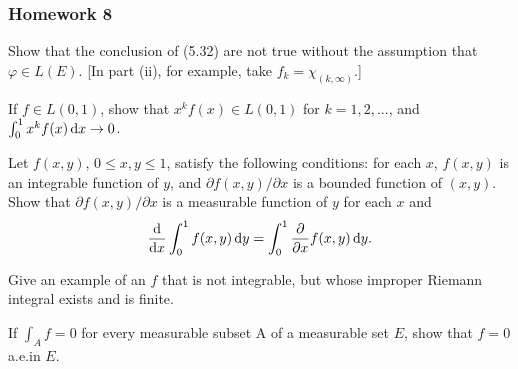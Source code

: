 \subsubsection{Homework 8}
\setcounter{exercise}{0}
\setcounter{equation}{0}

\begin{problem}
  Show that the conclusion of (5.32) are not true without the assumption
  that $\varphi\in L(E)$. [In part (ii), for example, take
  $f_k=\chi_{(k,\infty)}$.]
\end{problem}
\begin{solution}
\end{solution}

\begin{problem}
  If $f\in L(0,1)$, show that $x^kf(x)\in L(0,1)$ for $k=1,2,...$, and
  $\int_0^1 x^kf(x)\mathop{}\!\mathrm{d} x\to 0$.
\end{problem}
\begin{solution}
\end{solution}

\begin{problem}
  Let $f(x,y)$, $0\leq x,y\leq 1$, satisfy the following conditions: for
  each $x$, $f(x,y)$ is an integrable function of $y$, and
  $\partial f(x,y)/\partial x$ is a bounded function of $(x,y)$. Show that
  $\partial f(x,y)/\partial x$ is a measurable function of $y$ for each $x$
  and
  \[
    \frac{\mathrm{d}}{\mathrm{d} x}\int_0^1f(x,y)\mathop{}\!\mathrm{d}
    y=\int_0^1\frac{\partial}{\partial x}f(x,y)\mathop{}\!\mathrm{d} y.
  \]
\end{problem}
\begin{solution}
\end{solution}

\begin{problem}
  Give an example of an $f$ that is not integrable, but whose improper
  Riemann integral exists and is finite.
\end{problem}
\begin{solution}
\end{solution}

\begin{problem}
  If $\int_A f=0$ for every measurable subset A of a measurable set $E$,
  show that $f=0$ a.e.\@ in $E$.
\end{problem}
\begin{solution}
\end{solution}

